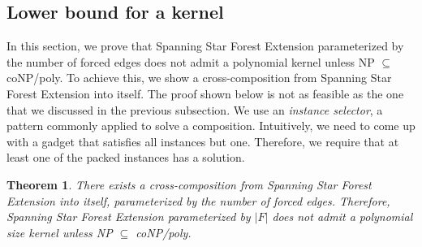 \documentclass[en]{pracamgr}
\newtheorem{theorem}{Theorem}
\newcommand{\ssfep}{{\sc Spanning Star Forest Extension}}
\begin{document}
\subsection{Lower bound for a kernel}

In this section, we prove that \ssfep{} parameterized by the number of forced edges does not admit a polynomial kernel unless NP $\subseteq$ coNP/poly. To achieve this, we show a cross-composition from \ssfep{} into itself. The proof shown below is not as feasible as the one that we discussed in the previous subsection. We use an \emph{instance selector}, a pattern commonly applied to solve a composition. Intuitively, we need to come up with a gadget that satisfies all instances but one. Therefore, we require that at least one of the packed instances has a solution.

\begin{theorem}
	There exists a cross-composition from \ssfep{} into itself, parameterized by the number of forced edges. Therefore, \ssfep{} parameterized by $|F|$ does not admit a polynomial size kernel unless \textup{NP $\subseteq$ coNP/poly}.
\end{theorem}
\end{document}
